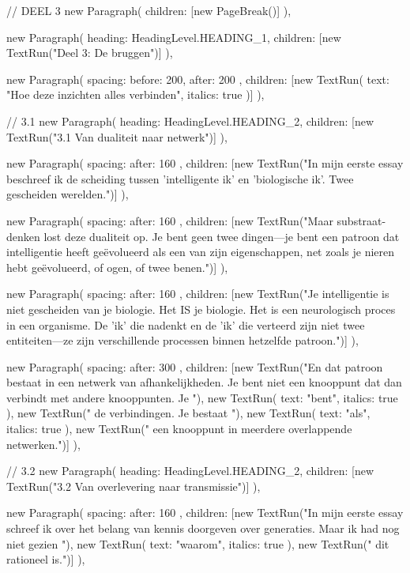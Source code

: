 {{      // DEEL 3
      new Paragraph({ children: [new PageBreak()] }),

      new Paragraph({
        heading: HeadingLevel.HEADING_1,
        children: [new TextRun("Deel 3: De bruggen")]
      }),

      new Paragraph({
        spacing: { before: 200, after: 200 },
        children: [new TextRun({ text: "Hoe deze inzichten alles verbinden", italics: true })]
      }),

      // 3.1
      new Paragraph({
        heading: HeadingLevel.HEADING_2,
        children: [new TextRun("3.1 Van dualiteit naar netwerk")]
      }),

      new Paragraph({
        spacing: { after: 160 },
        children: [new TextRun("In mijn eerste essay beschreef ik de scheiding tussen 'intelligente ik' en 'biologische ik'. Twee gescheiden werelden.")]
      }),

      new Paragraph({
        spacing: { after: 160 },
        children: [new TextRun("Maar substraat-denken lost deze dualiteit op. Je bent geen twee dingen—je bent een patroon dat intelligentie heeft geëvolueerd als een van zijn eigenschappen, net zoals je nieren hebt geëvolueerd, of ogen, of twee benen.")]
      }),

      new Paragraph({
        spacing: { after: 160 },
        children: [new TextRun("Je intelligentie is niet gescheiden van je biologie. Het IS je biologie. Het is een neurologisch proces in een organisme. De 'ik' die nadenkt en de 'ik' die verteerd zijn niet twee entiteiten—ze zijn verschillende processen binnen hetzelfde patroon.")]
      }),

      new Paragraph({
        spacing: { after: 300 },
        children: [new TextRun("En dat patroon bestaat in een netwerk van afhankelijkheden. Je bent niet een knooppunt dat dan verbindt met andere knooppunten. Je "), new TextRun({ text: "bent", italics: true }), new TextRun(" de verbindingen. Je bestaat "), new TextRun({ text: "als", italics: true }), new TextRun(" een knooppunt in meerdere overlappende netwerken.")]
      }),

      // 3.2
      new Paragraph({
        heading: HeadingLevel.HEADING_2,
        children: [new TextRun("3.2 Van overlevering naar transmissie")]
      }),

      new Paragraph({
        spacing: { after: 160 },
        children: [new TextRun("In mijn eerste essay schreef ik over het belang van kennis doorgeven over generaties. Maar ik had nog niet gezien "), new TextRun({ text: "waarom", italics: true }), new TextRun(" dit rationeel is.")]
      }),

}}
